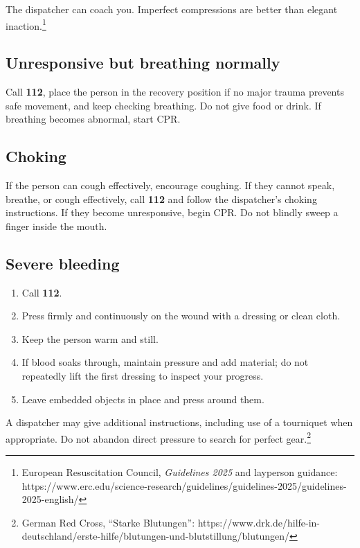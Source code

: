 The dispatcher can coach you. Imperfect compressions are better than
elegant inaction.\footnote{European Resuscitation Council,
  \emph{Guidelines 2025} and layperson guidance:
  https://www.erc.edu/science-research/guidelines/guidelines-2025/guidelines-2025-english/}

\hypertarget{unresponsive-but-breathing-normally}{%
\subsection{Unresponsive but breathing
normally}\label{unresponsive-but-breathing-normally}}

Call \textbf{112}, place the person in the recovery position if no major
trauma prevents safe movement, and keep checking breathing. Do not give
food or drink. If breathing becomes abnormal, start CPR.

\hypertarget{choking}{%
\subsection{Choking}\label{choking}}

If the person can cough effectively, encourage coughing. If they cannot
speak, breathe, or cough effectively, call \textbf{112} and follow the
dispatcher's choking instructions. If they become unresponsive, begin
CPR. Do not blindly sweep a finger inside the mouth.

\hypertarget{severe-bleeding}{%
\subsection{Severe bleeding}\label{severe-bleeding}}

\begin{enumerate}
\def\labelenumi{\arabic{enumi}.}
\tightlist
\item
  Call \textbf{112}.
\item
  Press firmly and continuously on the wound with a dressing or clean
  cloth.
\item
  Keep the person warm and still.
\item
  If blood soaks through, maintain pressure and add material; do not
  repeatedly lift the first dressing to inspect your progress.
\item
  Leave embedded objects in place and press around them.
\end{enumerate}

A dispatcher may give additional instructions, including use of a
tourniquet when appropriate. Do not abandon direct pressure to search
for perfect gear.\footnote{German Red Cross, ``Starke Blutungen'':
  https://www.drk.de/hilfe-in-deutschland/erste-hilfe/blutungen-und-blutstillung/blutungen/}

